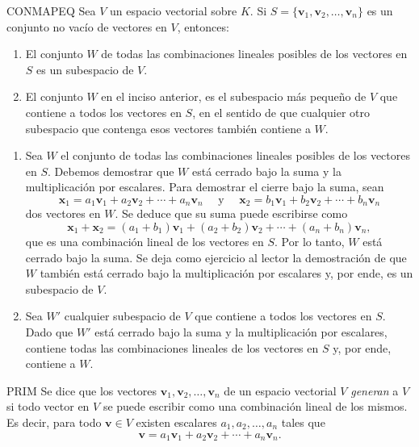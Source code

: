 \begin{theorem}{}{CONMAPEQ}
    Sea $V$ un espacio vectorial sobre $K$. Si $S = \{\mathbf{v}_1, \mathbf{v}_2, \dots, \mathbf{v}_n\}$ es un conjunto no vacío de vectores en $V$, entonces:
    \begin{enumerate}[label=\alph*), topsep=6pt, itemsep=0pt]
        \item El conjunto $W$ de todas las combinaciones lineales posibles de los vectores en $S$ es un subespacio de $V$.
        \item El conjunto $W$ en el inciso anterior, es el subespacio más pequeño de $V$ que contiene a todos los vectores en $S$, en el sentido de que cualquier otro subespacio que contenga esos vectores también contiene a $W$.
    \end{enumerate}

    \newpage
    \demostracion
    \begin{enumerate}[label=\alph*), topsep=6pt, itemsep=0pt]
        \item Sea $W$ el conjunto de todas las combinaciones lineales posibles de los vectores en $S$. Debemos demostrar que $W$ está cerrado bajo la suma y la multiplicación por escalares. Para demostrar el cierre bajo la suma, sean
        $$\mathbf{x}_1 = a_1\mathbf{v}_1 + a_2\mathbf{v}_2 + \cdots + a_n\mathbf{v}_n \quad \text{ y } \quad \mathbf{x}_2 = b_1\mathbf{v}_1 + b_2\mathbf{v}_2 + \cdots + b_n\mathbf{v}_n$$
        dos vectores en $W$. Se deduce que su suma puede escribirse como
        $$\mathbf{x}_1 + \mathbf{x}_2 = (a_1 + b_1) \mathbf{v}_1 + (a_2 + b_2) \mathbf{v}_2 + \cdots + (a_n + b_n) \mathbf{v}_n,$$
        que es una combinación lineal de los vectores en $S$. Por lo tanto, $W$ está cerrado bajo la suma. Se deja como ejercicio al lector la demostración de que $W$ también está cerrado bajo la multiplicación por escalares y, por ende, es un subespacio de $V$.
        \item Sea $W'$ cualquier subespacio de $V$ que contiene a todos los vectores en $S$. Dado que $W'$ está cerrado bajo la suma y la multiplicación por escalares, contiene todas las combinaciones lineales de los vectores en $S$ y, por ende, contiene a $W$.
    \end{enumerate}
\end{theorem}

\begin{definicion}{}{PRIM}
    Se dice que los vectores $\mathbf{v}_1, \mathbf{v}_2, \dots, \mathbf{v}_n$ de un espacio vectorial $V$ \emph{generan} a $V$ si todo vector en $V$ se puede escribir como una combinación lineal de los mismos. Es decir, para todo $\mathbf{v} \in V$ existen escalares $a_1, a_2, \dots, a_n$ tales que
    $$\mathbf{v} = a_1\mathbf{v}_1 + a_2\mathbf{v}_2 + \cdots + a_n\mathbf{v}_n.$$
\end{definicion}

